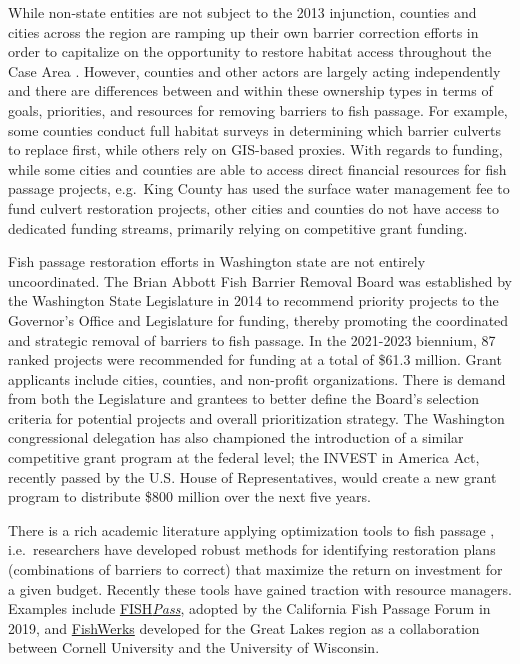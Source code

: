 While non-state entities are not subject to the 2013 injunction, counties and cities across the region are ramping up their own barrier correction efforts in order to capitalize on the opportunity to restore habitat access throughout the Case Area \citep{brown_coming_2019}. However, counties and other actors are largely acting independently and there are differences between and within these ownership types in terms of goals, priorities, and resources for removing barriers to fish passage. For example, some counties conduct full habitat surveys in determining which barrier culverts to replace first, while others rely on GIS-based proxies. With regards to funding, while some cities and counties are able to access direct financial resources for fish passage projects, e.g.\ King County has used the surface water management fee to fund culvert restoration projects, other cities and counties do not have access to dedicated funding streams, primarily relying on competitive grant funding. 

Fish passage restoration efforts in Washington state are not entirely uncoordinated. The Brian Abbott Fish Barrier Removal Board was established by the Washington State Legislature in 2014 to recommend priority projects to the Governor's Office and Legislature for funding, thereby promoting the coordinated and strategic removal of barriers to fish passage. In the 2021-2023 biennium, 87 ranked projects were recommended for funding at a total of \$61.3 million. Grant applicants include cities, counties, and non-profit organizations. There is demand from both the Legislature and grantees to better define the Board's selection criteria for potential projects and overall prioritization strategy. The Washington congressional delegation has also championed the introduction of a similar competitive grant program at the federal level; the INVEST in America Act, recently passed by the U.S. House of Representatives, would create a new grant program to distribute \$800 million over the next five years.


There is a rich academic literature applying optimization tools to fish passage \citep{ohanley_optimizing_2005, kuby_multiobjective_2005, couto_safeguarding_2021}, i.e.\ researchers have developed robust methods for identifying restoration plans (combinations of barriers to correct) that maximize the return on investment for a given budget. Recently these tools have gained traction with resource managers. Examples include  \href{https://fishpass.psmfc.org}{FISH\emph{Pass}}, adopted by the California Fish Passage Forum in 2019, and \href{https://greatlakesconnectivity.org}{FishWerks} developed for the Great Lakes region as a collaboration between Cornell University and the University of Wisconsin. 

